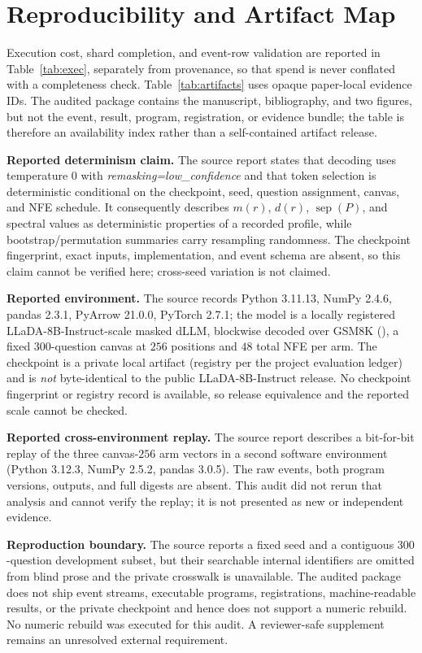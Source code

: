 \documentclass{article}
\begin{document}
\section{Reproducibility and Artifact Map}\label{app:artifacts}

Execution cost, shard completion, and event-row validation are reported in
Table~\ref{tab:exec}, separately from provenance, so that spend is never conflated
with a completeness check. Table~\ref{tab:artifacts} uses opaque paper-local
evidence IDs. The audited package contains the manuscript, bibliography, and two
figures, but not the event, result, program, registration, or evidence bundle;
the table is therefore an availability index rather than a self-contained
artifact release.

\textbf{Reported determinism claim.} The source report states that decoding
uses temperature $0$ with \emph{remasking=low\_confidence} and that token
selection is deterministic conditional on the checkpoint, seed, question
assignment, canvas, and NFE schedule. It consequently describes $m(r)$, $d(r)$,
$\operatorname{sep}(P)$, and spectral values as deterministic properties of a
recorded profile, while bootstrap/permutation summaries carry resampling
randomness. The checkpoint fingerprint, exact inputs, implementation, and event
schema are absent, so this claim cannot be verified here; cross-seed variation is
not claimed.

\textbf{Reported environment.} The source records Python 3.11.13, NumPy
2.4.6, pandas 2.3.1, PyArrow 21.0.0, PyTorch 2.7.1; the model is a locally
registered LLaDA-8B-Instruct-scale masked dLLM, blockwise decoded over GSM8K
(\citealt{cobbe2021gsm8k}), a fixed $300$-question canvas at $256$ positions and
$48$ total NFE per arm. The checkpoint is a private local artifact (registry per
the project evaluation ledger) and is \emph{not} byte-identical to the public
LLaDA-8B-Instruct release. No checkpoint fingerprint or registry record is
available, so release equivalence and the reported scale cannot be checked.

\textbf{Reported cross-environment replay.} The source report describes a
bit-for-bit replay of the three canvas-$256$ arm vectors in a second software
environment (Python 3.12.3, NumPy 2.5.2, pandas 3.0.5). The raw events, both
program versions, outputs, and full digests are absent. This audit did not
rerun that analysis and cannot verify the replay; it is not presented as new or
independent evidence.

\textbf{Reproduction boundary.} The source reports a fixed seed and a contiguous
$300$-question development subset, but their searchable internal identifiers are
omitted from blind prose and the private crosswalk is unavailable. The audited
package does not ship event streams, executable programs, registrations,
machine-readable results, or the private checkpoint and hence does not support a
numeric rebuild. No numeric rebuild was executed for this audit. A reviewer-safe
supplement remains an unresolved external requirement.
\end{document}
